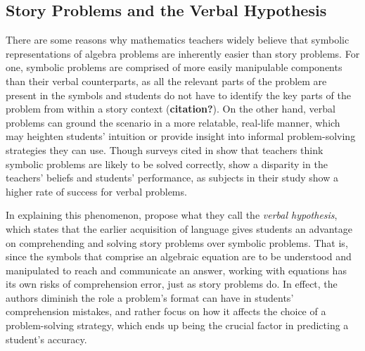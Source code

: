 \documentclass[10pt,letterpaper]{article}
\begin{document}
\subsection{Story Problems and the Verbal Hypothesis}

There are some reasons why mathematics teachers widely believe that symbolic representations of algebra problems are inherently easier than story problems. For one, symbolic problems are comprised of more easily manipulable components than their verbal counterparts, as all the relevant parts of the problem are present in the symbols and students do not have to identify the key parts of the problem from within a story context (\textbf{citation?}). On the other hand, verbal problems can ground the scenario in a more relatable, real-life manner, which may heighten students’ intuition or provide insight into informal problem-solving strategies they can use. Though surveys cited in  show that teachers think symbolic problems are likely to be solved correctly,  show a disparity in the teachers' beliefs and students' performance, as  subjects in their study show a higher rate of success for verbal problems.

In explaining this phenomenon,  propose what they call the \textit{verbal hypothesis}, which states that the earlier acquisition of language gives students an advantage on comprehending and solving story problems over symbolic problems. That is, since the symbols that comprise an algebraic equation are to be understood and manipulated to reach and communicate an answer, working with equations has its own risks of comprehension error, just as story problems do. In effect, the authors diminish the role a problem's format can have in students' comprehension mistakes, and rather focus on how it affects the choice of a problem-solving strategy, which ends up being the crucial factor in predicting a student's accuracy.
\end{document}
